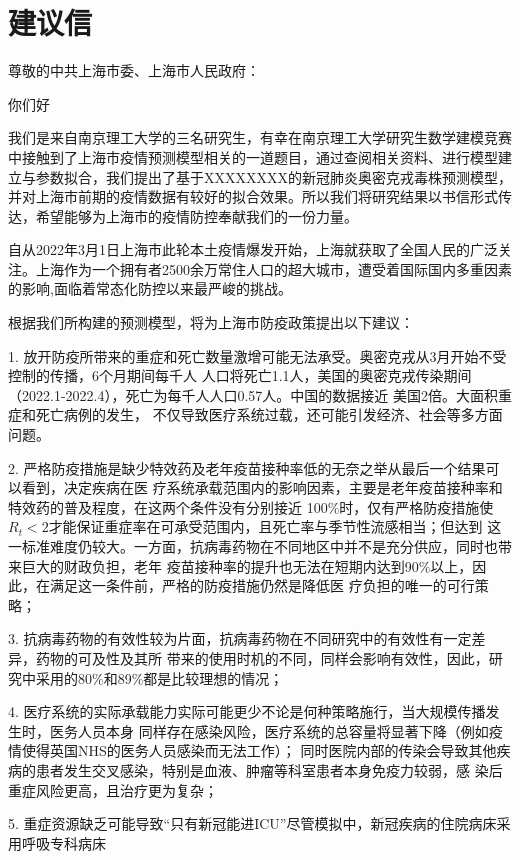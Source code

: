 \documentclass[bwprint]{gmcmthesis}
\numberwithin{figure}{section}
\begin{document}
\section{建议信}
\begin{flushleft}
    尊敬的中共上海市委、上海市人民政府：
\end{flushleft}
\par 你们好
\par 我们是来自南京理工大学的三名研究生，有幸在南京理工大学研究生数学建模竞赛中接触到了上海市疫情预测模型相关的一道题目，通过查阅相关资料、进行模型建立与参数拟合，我们提出了基于XXXXXXXX的新冠肺炎奥密克戎毒株预测模型，并对上海市前期的疫情数据有较好的拟合效果。所以我们将研究结果以书信形式传达，希望能够为上海市的疫情防控奉献我们的一份力量。
\par 自从2022年3月1日上海市此轮本土疫情爆发开始，上海就获取了全国人民的广泛关注。上海作为一个拥有者2500余万常住人口的超大城市，遭受着国际国内多重因素的影响,面临着常态化防控以来最严峻的挑战。
\par 根据我们所构建的预测模型，将为上海市防疫政策提出以下建议：
\par 1. 放开防疫所带来的重症和死亡数量激增可能无法承受。奥密克戎从3月开始不受控制的传播，6个月期间每千人
人口将死亡1.1人，美国的奥密克戎传染期间（2022.1-2022.4），死亡为每千人人口0.57人。中国的数据接近
美国2倍。大面积重症和死亡病例的发生， 不仅导致医疗系统过载，还可能引发经济、社会等多方面问题。
\par 2. 严格防疫措施是缺少特效药及老年疫苗接种率低的无奈之举从最后一个结果可以看到，决定疾病在医
疗系统承载范围内的影响因素，主要是老年疫苗接种率和特效药的普及程度，在这两个条件没有分别接近
100$\%$时，仅有严格防疫措施使$R_t<2$才能保证重症率在可承受范围内，且死亡率与季节性流感相当；但达到
这一标准难度仍较大。一方面，抗病毒药物在不同地区中并不是充分供应，同时也带来巨大的财政负担，老年
疫苗接种率的提升也无法在短期内达到90$\%$以上，因此，在满足这一条件前，严格的防疫措施仍然是降低医
疗负担的唯一的可行策略；
\par 3. 抗病毒药物的有效性较为片面，抗病毒药物在不同研究中的有效性有一定差异，药物的可及性及其所
带来的使用时机的不同，同样会影响有效性，因此，研究中采用的80$\%$和89$\%$都是比较理想的情况；
\par 4. 医疗系统的实际承载能力实际可能更少不论是何种策略施行，当大规模传播发生时，医务人员本身
同样存在感染风险，医疗系统的总容量将显著下降（例如疫情使得英国NHS的医务人员感染而无法工作）；
同时医院内部的传染会导致其他疾病的患者发生交叉感染，特别是血液、肿瘤等科室患者本身免疫力较弱，感
染后重症风险更高，且治疗更为复杂；
\par 5. 重症资源缺乏可能导致“只有新冠能进ICU”尽管模拟中，新冠疾病的住院病床采用呼吸专科病床
\end{document}
